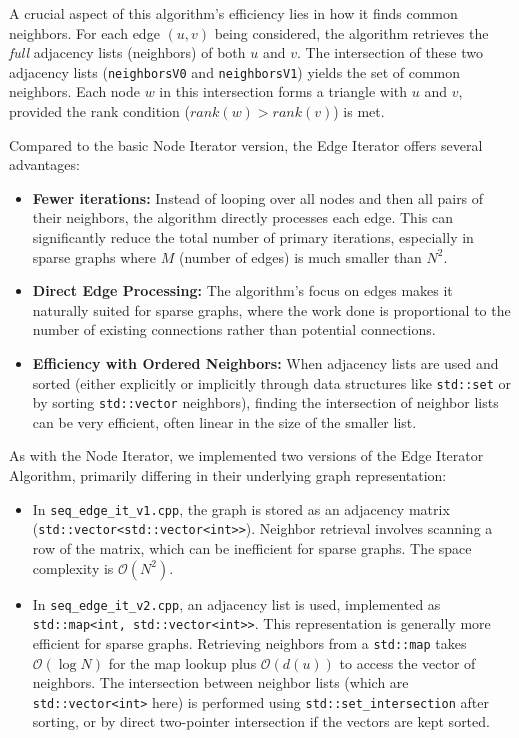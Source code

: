 \documentclass{aes2e}
\begin{document}
A crucial aspect of this algorithm's efficiency lies in how it finds common neighbors. For each edge $(u, v)$ being considered, the algorithm retrieves the \textit{full} adjacency lists (neighbors) of both $u$ and $v$. The intersection of these two adjacency lists (\texttt{neighborsV0} and \texttt{neighborsV1}) yields the set of common neighbors. Each node $w$ in this intersection forms a triangle with $u$ and $v$, provided the rank condition ($rank(w) > rank(v)$) is met.

Compared to the basic Node Iterator version, the Edge Iterator offers several advantages:

\begin{itemize}
    \item \textbf{Fewer iterations:} Instead of looping over all nodes and then all pairs of their neighbors, the algorithm directly processes each edge. This can significantly reduce the total number of primary iterations, especially in sparse graphs where $M$ (number of edges) is much smaller than $N^2$.
    \item \textbf{Direct Edge Processing:} The algorithm's focus on edges makes it naturally suited for sparse graphs, where the work done is proportional to the number of existing connections rather than potential connections.
    \item \textbf{Efficiency with Ordered Neighbors:} When adjacency lists are used and sorted (either explicitly or implicitly through data structures like \texttt{std::set} or by sorting \texttt{std::vector} neighbors), finding the intersection of neighbor lists can be very efficient, often linear in the size of the smaller list.
\end{itemize}

As with the Node Iterator, we implemented two versions of the Edge Iterator Algorithm, primarily differing in their underlying graph representation:

\begin{itemize}
    \item In \texttt{seq\_edge\_it\_v1.cpp}, the graph is stored as an adjacency matrix (\texttt{std::vector<std::vector<int>>}). Neighbor retrieval involves scanning a row of the matrix, which can be inefficient for sparse graphs. The space complexity is $\mathcal{O}(N^2)$.
    \item In \texttt{seq\_edge\_it\_v2.cpp}, an adjacency list is used, implemented as \texttt{std::map<int, std::vector<int>>}. This representation is generally more efficient for sparse graphs. Retrieving neighbors from a \texttt{std::map} takes $\mathcal{O}(\log N)$ for the map lookup plus $\mathcal{O}(d(u))$ to access the vector of neighbors. The intersection between neighbor lists (which are \texttt{std::vector<int>} here) is performed using \texttt{std::set\_intersection} after sorting, or by direct two-pointer intersection if the vectors are kept sorted.
\end{itemize}
\end{document}

